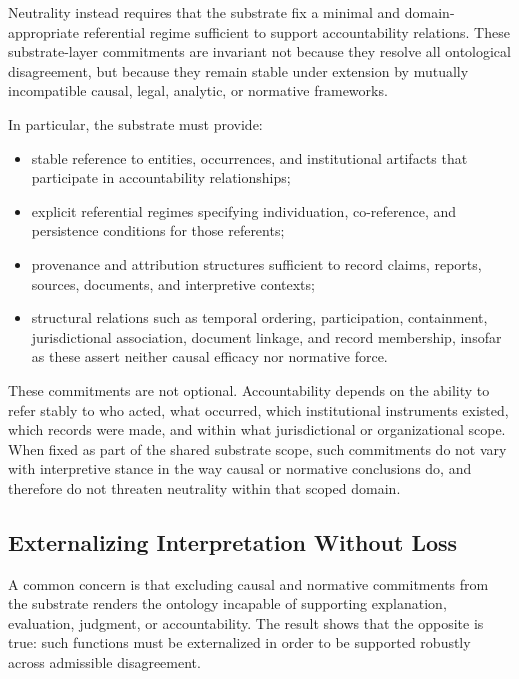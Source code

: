 Neutrality instead requires that
the substrate fix a minimal and domain-appropriate referential regime
sufficient to support accountability relations.
These substrate-layer commitments are invariant
not because they resolve all ontological disagreement,
but because they remain stable under extension
by mutually incompatible causal, legal, analytic, or normative frameworks.

In particular, the substrate must provide:
\begin{itemize}
  \item stable reference to entities, occurrences,
        and institutional artifacts that participate
        in accountability relationships;
  \item explicit referential regimes specifying
        individuation, co-reference, and persistence conditions
        for those referents;
  \item provenance and attribution structures sufficient
        to record claims, reports, sources, documents,
        and interpretive contexts;
  \item structural relations such as temporal ordering,
        participation, containment, jurisdictional association,
        document linkage, and record membership,
        insofar as these assert neither causal efficacy
        nor normative force.
\end{itemize}

These commitments are not optional.
Accountability depends on the ability
to refer stably to who acted, what occurred,
which institutional instruments existed,
which records were made,
and within what jurisdictional or organizational scope.
When fixed as part of the shared substrate scope,
such commitments do not vary with interpretive stance
in the way causal or normative conclusions do,
and therefore do not threaten neutrality within that scoped domain.

\subsection{Externalizing Interpretation Without Loss}
\label{sec:externalizing-interpretation}

A common concern is that excluding causal and normative commitments
from the substrate renders the ontology incapable of supporting
explanation, evaluation, judgment, or accountability.
The result shows that the opposite is true:
such functions must be externalized in order to be supported robustly
across admissible disagreement.


